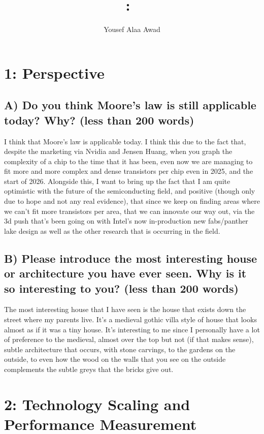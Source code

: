 \documentclass{article}
\title{
    \vspace{2in}
    \textmd{\textbf{\hmwkClass:\ \hmwkTitle}}\\
    \normalsize\vspace{0.1in}
    \vspace{3in}
}
\author{Yousef Alaa Awad}
\begin{document}
\maketitle
\pagebreak

\section{1: Perspective}

\subsection{A) Do you think Moore’s law is still applicable today? Why? (less than 200 words)}
I think that Moore's law is applicable today. I think this due to the fact that, despite the marketing via Nvidia and Jensen Huang, when you graph the complexity of a chip to the time that it has been, even now we are managing to fit more and more complex and dense transistors per chip even in 2025, and the start of 2026. Alongside this, I want to bring up the fact that I am quite optimistic with the future of the semiconducting field, and positive (though only due to hope and not any real evidence), that since we keep on finding areas where we can't fit more transistors per area, that we can innovate our way out, via the 3d push that's been going on with Intel's now in-production new fabs/panther lake design as well as the other research that is occurring in the field.

\subsection{B) Please introduce the most interesting house or architecture you have ever seen. Why is it so interesting to you? (less than 200 words)}
The most interesting house that I have seen is the house that exists down the street where my parents live. It's a medieval gothic villa style of house that looks almost as if it was a tiny house. It's interesting to me since I personally have a lot of preference to the medieval, almost over the top but not (if that makes sense), subtle architecture that occurs, with stone carvings, to the gardens on the outside, to even how the wood on the walls that you see on the outside complements the subtle greys that the bricks give out.

\section{2: Technology Scaling and Performance Measurement}
\end{document}
